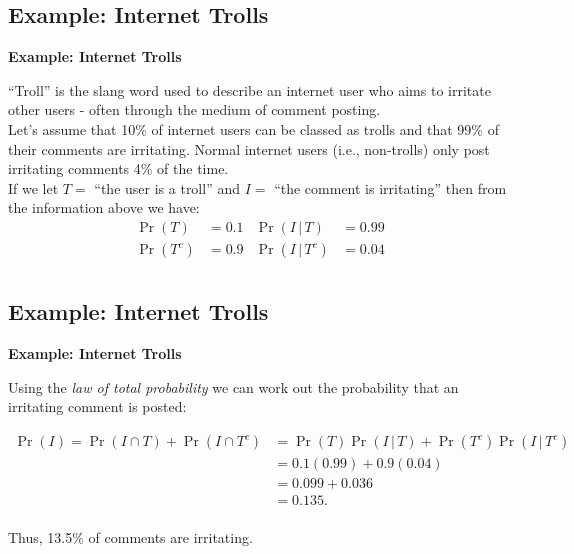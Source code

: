 \documentclass[compress]{beamer}        %
\makeatletter
\newcommand{\tcb}{\textcolor{beamer@blendedblue}}
\makeatother
\begin{document}
\subsection{Example: Internet Trolls}
\begin{frame}{\bf \tcb{Example: Internet Trolls}}

``Troll'' is the slang word used to describe an internet user who aims to irritate other users - often through the medium of comment posting.\\[0.6cm]

Let's assume that 10\% of internet users can be classed as trolls and that 99\% of their comments are irritating. Normal internet users (i.e., non-trolls) only post irritating comments 4\% of the time.\\[0.6cm]

If we let $T =$ ``the user is a troll'' and $I = $ ``the comment is irritating'' then from the information above we have:
\begin{align*}
\Pr(T) &= 0.1 & \Pr(I\,|\,T) & = 0.99 \\[0.2cm]
\Pr(T^c) &= 0.9 & \Pr(I\,|\,T^c) & = 0.04 \\
\end{align*}


\end{frame}


\subsection{Example: Internet Trolls}
\begin{frame}{\bf \tcb{Example: Internet Trolls}}

Using the \emph{law of total probability} we can work out the probability that an irritating comment is posted:

\begin{align*}
\Pr(I) = \Pr(I \cap T) + \Pr(I \cap T^c) &= \Pr(T) \Pr(I\,|\,T) + \Pr(T^c) \Pr(I\,|\,T^c) \\[0.2cm]
&= 0.1 (0.99) + 0.9(0.04) \\[0.2cm]
&= 0.099 + 0.036 \\[0.2cm]
&= 0.135.\\[-0.2cm]
\end{align*}

Thus, 13.5\% of comments are irritating.

\end{frame}
\end{document}

